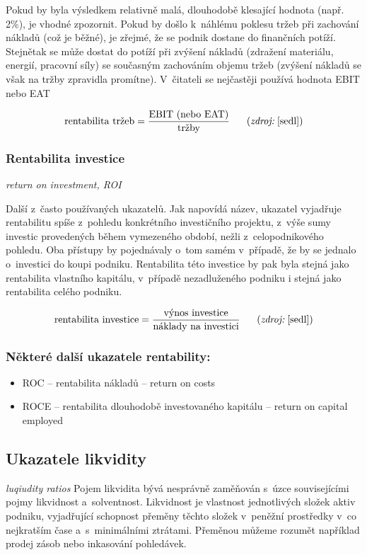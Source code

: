 Pokud by byla výsledkem relativně malá, dlouhodobě klesající hodnota (např. 2\%), je vhodné zpozornit. Pokud by došlo k~náhlému poklesu tržeb při zachování nákladů (což je běžné), je zřejmé, že se podnik dostane do finančních potíží. Stejnětak se může dostat do potíží při zvýšení nákladů (zdražení materiálu, energií, pracovní síly) se současným zachováním objemu tržeb (zvýšení nákladů se však na tržby zpravidla promítne). 
V~čitateli se nejčastěji používá hodnota EBIT nebo EAT

$$\vz{rentabilita tržeb}{EBIT (nebo EAT)}{tržby} \scite{sedl}$$ 

\pagebreak
\subsubsection{Rentabilita investice}
\textit{return on investment, ROI}

Další z~často používaných ukazatelů. Jak napovídá název, ukazatel vyjadřuje rentabilitu spíše z~pohledu konkrétního investičního projektu, z~výše sumy investic provedených během vymezeného období, nežli z~celopodnikového pohledu. Oba přístupy by pojednávaly o~tom samém v~případě, že by se jednalo o~investici do koupi podniku. Rentabilita této investice by pak byla stejná jako rentabilita vlastního kapitálu, v~případě nezadluženého podniku i stejná jako rentabilita celého podniku.

$$\vz{rentabilita investice}{výnos investice}{náklady na investici} \scite{sedl} $$ 

\subsubsection{Některé další ukazatele rentability:}
\begin{itemize}
\item{ROC -- rentabilita nákladů} -- return on costs
\item{ROCE -- rentabilita dlouhodobě investovaného kapitálu} -- return on capital employed
\end{itemize}







\subsection{Ukazatele likvidity}
\textit{luqiudity ratios}
Pojem likvidita bývá nesprávně zaměňován s~úzce souvisejícími pojmy likvidnost a~solventnost. Likvidnost je vlastnost jednotlivých složek aktiv podniku, vyjadřující schopnost přeměny těchto složek v~peněžní prostředky v~co nejkratším čase a~s~minimálními ztrátami.\cite{nyvlt} Přeměnou můžeme rozumět například prodej zásob nebo inkasování pohledávek. 

